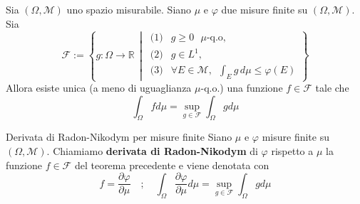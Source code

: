 \begin{theorem}\label{thm:dec_rad_nik}
    Sia \((\Omega, \mathcal{M})\) uno spazio misurabile. Siano \(\mu\) e
    \(\varphi\) due misure finite su \((\Omega, \mathcal{M})\). 
    Sia
    \[
        \mathcal{F} := \left\{ 
        g : \Omega \to \mathbb{R} \, \middle| \,
        \begin{array}{ll}
            \text{(1)} & g \geq 0 \text{ \(\mu\)-q.o}, \\
            \text{(2)} & g \in L^1, \\
            \text{(3)} & \forall E \in \mathcal{M}, \, \,\, \int_E g \, d\mu \leq \varphi(E)
        \end{array}
        \right\}
    \]
    Allora esiste unica (a meno di uguaglianza \(\mu\)-q.o.) una funzione \(f
    \in \mathcal{F}\) tale che \[
        \int_\Omega f d\mu = \sup_{g \in \mathcal{F}}  \int_\Omega g d\mu
    \]
\end{theorem}
\begin{definition}[label=def:rad_nik_1]{Derivata di Radon-Nikodym per misure
    finite}
    Siano \(\mu\) e \(\varphi \) misure finite su \((\Omega, \mathcal{M})\).
    Chiamiamo \textbf{derivata di Radon-Nikodym} di \(\varphi \) rispetto a
    \(\mu\) la funzione \(f \in \mathcal{F}\) del teorema precedente e viene
    denotata con
    \[
        f = \frac{\partial \varphi}{\partial \mu } \quad ;\quad \int_\Omega \frac{\partial
        \varphi}{\partial \mu } d\mu = \sup_{g \in \mathcal{F}} \int_\Omega g d\mu
    \]
\end{definition}
